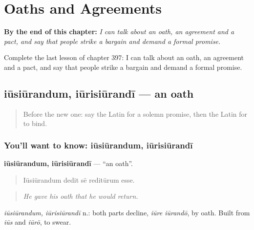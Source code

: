 
\chapter{Oaths and Agreements}
\label{ch:la-oaths-and-agreements}

\begin{chapteropening}
\textbf{By the end of this chapter:} \emph{I can talk about an oath, an agreement and a pact, and say that people strike a bargain and demand a formal promise.}

Complete the last lesson of chapter 397: I can talk about an oath, an agreement and a pact, and say that people strike a bargain and demand a formal promise.
\end{chapteropening}

\section[iūsiūrandum, iūrisiūrandī]{iūsiūrandum, iūrisiūrandī — an oath}

\label{lesson:LA-C397-iusiurandum}



\begin{quote}
Before the new one: say the Latin for a solemn promise, then the Latin for to bind.
\end{quote}

\subsection*{You'll want to know: iūsiūrandum, iūrisiūrandī}
\textbf{iūsiūrandum, iūrisiūrandī} — \textquotedblleft{}an oath\textquotedblright{}.

\begin{quote}
Iūsiūrandum dedit sē reditūrum esse.
\end{quote}

\begin{quote}
\emph{He gave his oath that he would return.}
\end{quote}

\emph{iūsiūrandum, iūrisiūrandī} n.: both parts decline, \emph{iūre iūrandō}, by oath. Built from \emph{iūs} and \emph{iūrō}, to swear.

